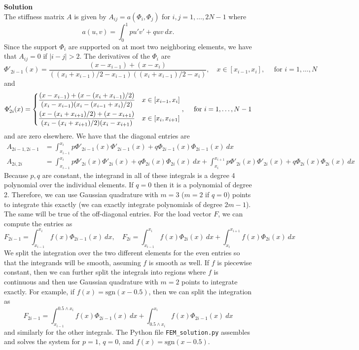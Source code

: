 \documentclass[11pt]{article}
\begin{document}
\begin{enumerate}
\begin{enumerate}
{\bf Solution}\\
The stiffness matrix $A$ is given by $A_{ij} = a(\Phi_i, \Phi_j)$ for $i,j = 1,\ldots,2N-1$ where
\[
a(u,v) = \int_0^1 pu'v' + quv\ dx.
\]
Since the support $\Phi_i$ are supported on at most two neighboring elements, we have that $A_{ij} = 0$ if $|i-j| > 2$.  The derivatives of the $\Phi_i$ are
\[
\Phi'_{2i-1}(x) = \frac{(x - x_{i-1}) + (x - x_i)}{((x_{i} + x_{i-1})/2 - x_{i-1})((x_{i} + x_{i-1})/2 - x_{i})}, \quad x \in [x_{i-1}, x_i],\quad \text{ for } i = 1,\ldots,N
\]
and
\[
\Phi_{2i}'(x) = \begin{dcases}
\frac{(x - x_{i-1}) + (x - (x_{i} + x_{i-1})/2)}{(x_i - x_{i-1})(x_i - (x_{i-1} + x_i)/2)} & x \in [x_{i-1}, x_{i}]\\
\frac{(x - (x_{i} + x_{i+1})/2) + (x - x_{i+1})}{(x_{i} - (x_{i} + x_{i+1})/2)(x_{i} - x_{i+1})}			& x \in [x_{i}, x_{i+1}]
\end{dcases}, \quad \text{ for } i = 1,\ldots,N-1
\]
and are zero elsewhere.  We have that the diagonal entries are
\begin{align*}
A_{2i-1,2i-1} &= \int_{x_{i-1}}^{x_i}p\Phi'_{2i-1}(x)\Phi'_{2i-1}(x) + q\Phi_{2i-1}(x)\Phi_{2i-1}(x)\ dx\\
A_{2i, 2i} &= \int_{x_{i-1}}^{x_i}p\Phi'_{2i}(x)\Phi'_{2i}(x) + q\Phi_{2i}(x)\Phi_{2i}(x)\ dx + \int_{x_{i}}^{x_{i+1}}p\Phi'_{2i}(x)\Phi'_{2i}(x) + q\Phi_{2i}(x)\Phi_{2i}(x)\ dx
\end{align*}
Because $p,q$ are constant, the integrand in all of these integrals is a degree 4 polynomial over the individual elements.  If $q = 0$ then it is a polynomial of degree 2.  Therefore, we can use Gaussian quadrature with $m = 3$ ($m = 2$ if $q=0$) points to integrate this exactly (we can exactly integrate polynomials of degree $2m-1$).  The same will be true of the off-diagonal entries.  For the load vector $F$, we can compute the entries as
\[
F_{2i-1} = \int_{x_{i-1}}^{x_i} f(x)\Phi_{2i-1}(x)\ dx, \quad F_{2i} = \int_{x_{i-1}}^{x_i} f(x)\Phi_{2i}(x)\ dx + \int_{x_i}^{x_{i+1}}f(x)\Phi_{2i}(x)\ dx
\]
We split the integration over the two different elements for the even entries so that the integrands will be smooth, assuming $f$ is smooth as well.  If $f$ is piecewise constant, then we can further split the integrals into regions where $f$ is continuous and then use Gaussian quadrature with $m=2$ points to integrate exactly.  For example, if $f(x) = \mathrm{sgn}(x - 0.5)$, then we can split the integration as
\[
F_{2i-1} = \int_{x_{i-1}}^{0.5 \wedge x_i} f(x)\Phi_{2i-1}(x)\ dx + \int_{0.5\wedge x_i}^{x_i} f(x)\Phi_{2i-1}(x)\ dx
\]
and similarly for the other integrals.  The Python file \texttt{FEM\_solution.py} assembles and solves the system for $p=1$, $q=0$, and $f(x) = \mathrm{sgn}(x-0.5)$.  


\end{enumerate}
\end{enumerate}
\end{document}
